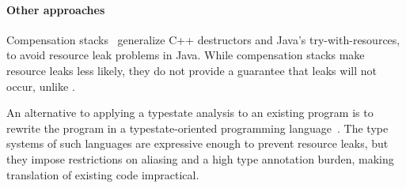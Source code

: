 \paragraph{Other approaches} Compensation stacks~\cite{WeimerN04}
generalize C++ destructors and Java's
try-with-resources, to avoid resource leak problems in Java.  While
compensation stacks make resource leaks less likely, they do not provide a
guarantee that leaks will not occur, unlike \Tool.

An alternative to applying a typestate analysis to an existing program
is to rewrite the program in a typestate-oriented programming
language~\cite{AldrichSSS2009,garcia2014typestate}.  The type systems of such
languages are expressive enough to prevent resource leaks, but they impose
restrictions on aliasing and a high type annotation burden, making translation
of existing code impractical.






